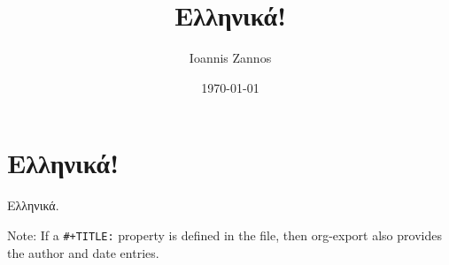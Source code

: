 \documentclass[11pt]{article}
\author{Ioannis Zannos}
\date{\today}
\title{Ελληνικά!}
\begin{document}
\maketitle
\tableofcontents


\section{Ελληνικά!}
\label{sec:orgbefc7c7}

Ελληνικά.

Note: If a \texttt{\#+TITLE:} property is defined in the file, then org-export also provides the author and date entries.
\end{document}
